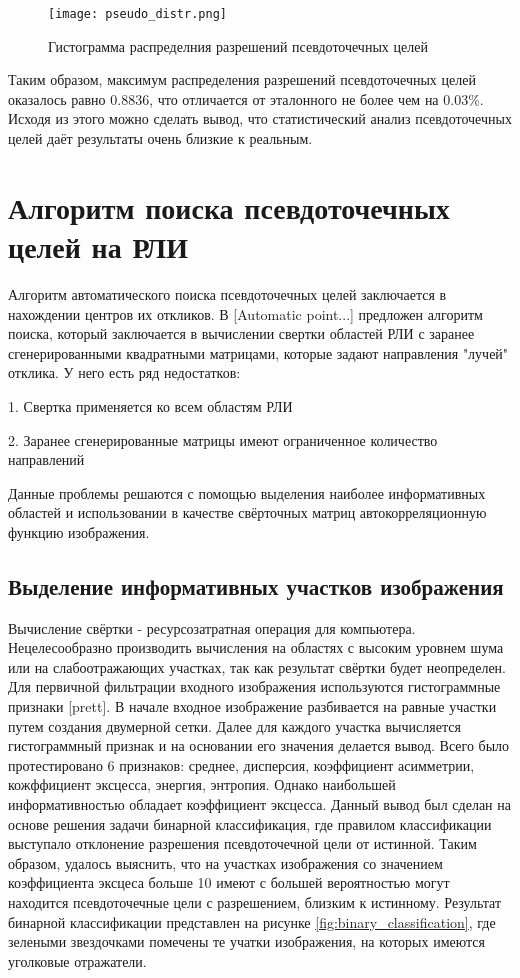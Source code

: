 \begin{figure}[ht]
    \centering
    \texttt{[image: pseudo\_distr.png]}
    \caption{Гистограмма распределния разрешений псевдоточечных целей}
    \label{fig:pseudo_distr}
\end{figure}

	Таким образом, максимум распределения разрешений псевдоточечных целей оказалось равно 0.8836, что отличается от эталонного не более чем на 0.03\%. Исходя из этого можно сделать вывод, что статистический анализ псевдоточечных целей даёт результаты очень близкие к реальным.

\section{Алгоритм поиска псевдоточечных целей на РЛИ}

	Алгоритм автоматического поиска псевдоточечных целей заключается в нахождении центров их откликов. В [Automatic point...] предложен алгоритм поиска, который заключается в вычислении свертки областей РЛИ с заранее сгенерированными квадратными матрицами, которые задают направления "лучей" отклика. У него есть ряд недостатков:
	
	1. Свертка применяется ко всем областям РЛИ
	
	2. Заранее сгенерированные матрицы имеют ограниченное количество направлений
	
	Данные проблемы решаются с помощью выделения наиболее информативных областей и использовании в качестве свёрточных матриц автокорреляционную функцию изображения.

\subsection{Выделение информативных участков изображения}

	Вычисление свёртки - ресурсозатратная операция для компьютера. Нецелесообразно производить вычисления на областях с высоким уровнем шума или на слабоотражающих участках, так как результат свёртки будет неопределен. Для первичной фильтрации входного изображения используются гистограммные признаки [prett]. В начале входное изображение разбивается на равные участки путем создания двумерной сетки. Далее для каждого участка вычисляется гистограммный признак и на основании его значения делается вывод. Всего было протестировано 6 признаков: среднее, дисперсия, коэффициент асимметрии, кожффициент эксцесса, энергия, энтропия. Однако наибольшей информативностью обладает коэффициент эксцесса. Данный вывод был сделан на основе решения задачи бинарной классификация, где правилом классификации выступало отклонение разрешения псевдоточечной цели от истинной. Таким образом, удалось выяснить, что на участках изображения со значением коэффициента эксцеса больше 10 имеют с большей вероятностью могут находится псевдоточечные цели с разрешением, близким к истинному. Результат бинарной классификации представлен на рисунке \ref{fig:binary_classification}, где зелеными звездочками помечены те учатки изображения, на которых имеются уголковые отражатели. 
	
